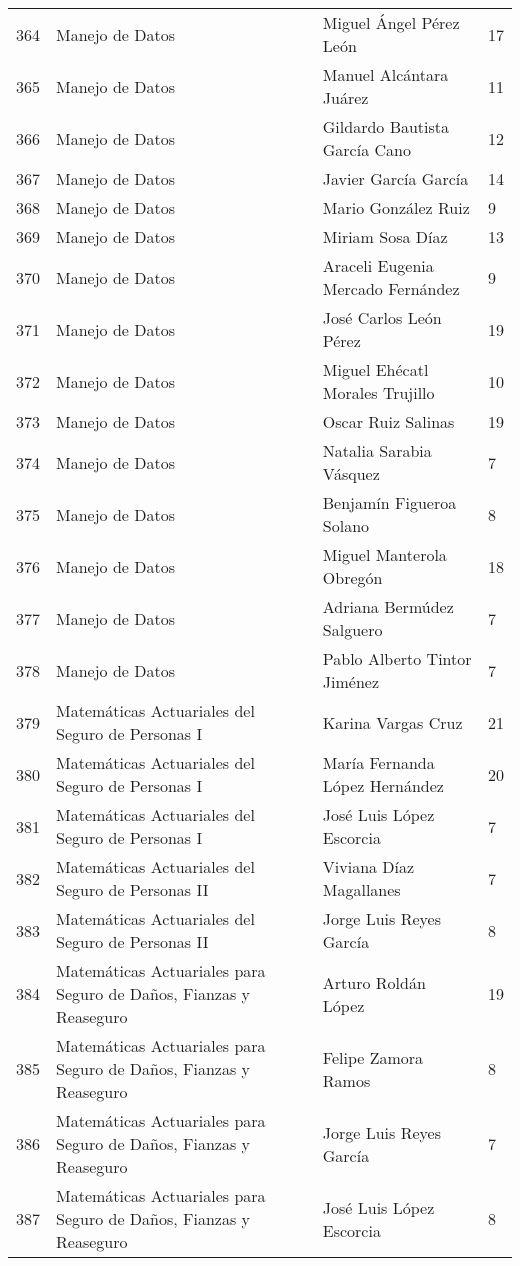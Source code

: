 \begin{table}[ht]
\begin{tabular}{rlll}
  364 & Manejo de Datos & Miguel Ángel Pérez León & 17 \\ 
  365 & Manejo de Datos & Manuel Alcántara Juárez & 11 \\ 
  366 & Manejo de Datos & Gildardo Bautista García Cano & 12 \\ 
  367 & Manejo de Datos & Javier García García & 14 \\ 
  368 & Manejo de Datos & Mario González Ruiz & 9 \\ 
  369 & Manejo de Datos & Miriam Sosa Díaz & 13 \\ 
  370 & Manejo de Datos & Araceli Eugenia Mercado Fernández & 9 \\ 
  371 & Manejo de Datos & José Carlos León Pérez & 19 \\ 
  372 & Manejo de Datos & Miguel Ehécatl Morales Trujillo & 10 \\ 
  373 & Manejo de Datos & Oscar Ruiz Salinas & 19 \\ 
  374 & Manejo de Datos & Natalia Sarabia Vásquez & 7 \\ 
  375 & Manejo de Datos & Benjamín Figueroa Solano & 8 \\ 
  376 & Manejo de Datos & Miguel Manterola Obregón & 18 \\ 
  377 & Manejo de Datos & Adriana Bermúdez Salguero & 7 \\ 
  378 & Manejo de Datos & Pablo Alberto Tintor Jiménez & 7 \\ 
  379 & Matemáticas Actuariales del Seguro de Personas I & Karina Vargas Cruz & 21 \\ 
  380 & Matemáticas Actuariales del Seguro de Personas I & María Fernanda López Hernández & 20 \\ 
  381 & Matemáticas Actuariales del Seguro de Personas I & José Luis López Escorcia & 7 \\ 
  382 & Matemáticas Actuariales del Seguro de Personas II & Viviana Díaz Magallanes & 7 \\ 
  383 & Matemáticas Actuariales del Seguro de Personas II & Jorge Luis Reyes García & 8 \\ 
  384 & Matemáticas Actuariales para Seguro de Daños, Fianzas y Reaseguro & Arturo Roldán López & 19 \\ 
  385 & Matemáticas Actuariales para Seguro de Daños, Fianzas y Reaseguro & Felipe Zamora Ramos & 8 \\ 
  386 & Matemáticas Actuariales para Seguro de Daños, Fianzas y Reaseguro & Jorge Luis Reyes García & 7 \\ 
  387 & Matemáticas Actuariales para Seguro de Daños, Fianzas y Reaseguro & José Luis López Escorcia & 8 \\ 

\end{tabular}
\end{table}
